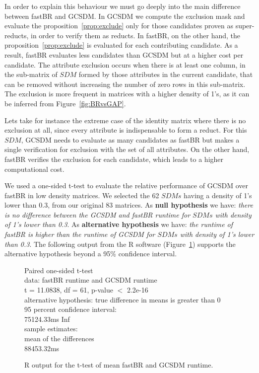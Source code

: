 \documentclass[authoryear,11pt]{elsarticle}
\begin{document}
	In order to explain this behaviour we must go deeply into the main difference between fastBR and GCSDM. 
	In GCSDM we compute the exclusion mask and evaluate the proposition~\ref{prop:exclude} only for those
	candidates proven as super-reducts, in order to verify them as reducts. In fastBR, on the other hand,
	the proposition~\ref{prop:exclude} is evaluated for each contributing candidate. As a result, fastBR
	evaluates less candidates than GCSDM but at a higher cost per candidate. The attribute exclusion
	occurs when there is at least one column, in the sub-matrix of $SDM$ formed by those attributes in the 
	current candidate, that can be removed without increasing the number of zero rows in this sub-matrix.
	The exclusion is more frequent in matrices with a higher density of 1's, as it can be inferred from  
	Figure~\ref{fig:BRvsGAP}. 
	
	Lets take for instance the extreme case of the identity matrix where there is no exclusion at all,
	since every attribute is indispensable to form a reduct. 	For this $SDM$, GCSDM needs to evaluate as 
	many candidates as fastBR but makes a single verification for exclusion with the set of all attributes. 
	On the other hand, fastBR verifies the exclusion for each candidate, which leads to a higher 
	computational cost.
	
	We used a one-sided t-test to evaluate the relative performance of GCSDM over fastBR in
	low density matrices. We selected the 62 $SDMs$ having a density 	of 1's lower than 0.3, from our original 
	83 matrices. As \textbf{null hypothesis} we have: \emph{there is no difference between the GCSDM and fastBR 
	runtime for $SDMs$ with density of 1's lower than 0.3}. As \textbf{alternative hypothesis} we have: 
	\emph{the runtime of fastBR is higher than the runtime of GCSDM for $SDMs$ with density of 1's lower than 
	0.3}. The following output from the R software (Figure~\ref{fig:R_fastBRvsGCSDM}) supports the alternative
	hypothesis beyond a 95\% confidence interval.
	
	\begin{figure}
		\qquad{}	Paired one-sided t-test\\

		data:  fastBR runtime and GCSDM runtime\\
		t = 11.0838, df = 61, p-value $<$ 2.2e-16\\
		alternative hypothesis: true difference in means is greater than 0\\
		95 percent confidence interval:\\
		 75124.33ms  \qquad{}  Inf\\
		sample estimates:\\
		mean of the differences \\
		 \qquad{}    88453.32ms
		 		 
		\centering
	  	\caption{R output for the t-test of mean fastBR and GCSDM runtime.}
	  	\label{fig:R_fastBRvsGCSDM}
	\end{figure}
	
\end{document}
